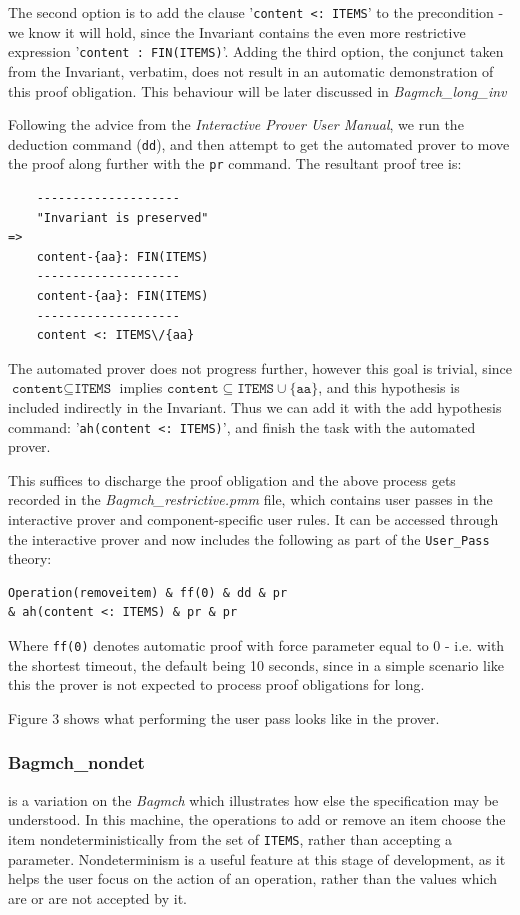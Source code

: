 \documentclass[12pt,journal,duplex]{IEEEtran}
\begin{document}
	The second option is to add the clause '\texttt{content <: ITEMS}' to the precondition - we know it will hold, since the Invariant contains the even more restrictive expression '\texttt{content :  FIN(ITEMS)}'. Adding the third option, the conjunct taken from the Invariant, verbatim, does not result in an automatic demonstration of this proof obligation. This behaviour will be later discussed in \emph{Bagmch\_long\_inv}


	Following the advice from the \emph{Interactive Prover User Manual}, we run the deduction command (\texttt{dd}), and then attempt to get the automated prover to move the proof along further with the \texttt{pr} command. The resultant proof tree is:

	\begin{lstlisting}
	--------------------
	"Invariant is preserved"
=>
	content-{aa}: FIN(ITEMS)
	--------------------
	content-{aa}: FIN(ITEMS)
	--------------------
	content <: ITEMS\/{aa}
	\end{lstlisting}

	The automated prover does not progress further, however this goal is trivial, since $\texttt{content} \subseteq \texttt{ITEMS}$ implies $\texttt{content} \subseteq \texttt{ITEMS} \cup \{\texttt{aa}\}$, and this hypothesis is included indirectly in the Invariant. Thus we can add it with the add hypothesis command: '\texttt{ah(content <: ITEMS)}', and finish the task with the automated prover.

	This suffices to discharge the proof obligation and the above process gets recorded in the \emph{Bagmch\_restrictive.pmm} file, which contains user passes in the interactive prover and component-specific user rules. It can be accessed through the interactive prover and now includes the following as part of the \texttt{User\_Pass} theory:

	\begin{lstlisting}
Operation(removeitem) & ff(0) & dd & pr
& ah(content <: ITEMS) & pr & pr
	\end{lstlisting}
	Where \texttt{ff(0)} denotes automatic proof with force parameter equal to 0 - i.e. with the shortest timeout, the default being 10 seconds, since in a simple scenario like this the prover is not expected to process proof obligations for long.

	Figure 3 shows what performing the user pass looks like in the prover.

	\subsubsection{Bagmch\_nondet} is a variation on the \emph{Bagmch} which illustrates how else the specification may be understood. In this machine, the operations to add or remove an item choose the item nondeterministically from the set of \texttt{ITEMS}, rather than accepting a parameter. Nondeterminism is a useful feature at this stage of development, as it helps the user focus on the action of an operation, rather than the values which are or are not accepted by it.
\end{document}
